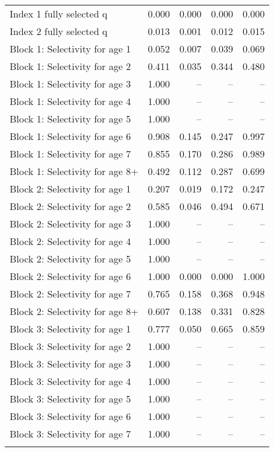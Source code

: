 \documentclass[
]{article}
\begin{document}
\begin{landscape}
\begin{longtable}[t]{lrrrr}
\endfoot
\bottomrule
\endlastfoot
Index 1 fully selected q & 0.000 & 0.000 & 0.000 & 0.000\\
Index 2 fully selected q & 0.013 & 0.001 & 0.012 & 0.015\\
Block 1: Selectivity for age 1 & 0.052 & 0.007 & 0.039 & 0.069\\
Block 1: Selectivity for age 2 & 0.411 & 0.035 & 0.344 & 0.480\\
Block 1: Selectivity for age 3 & 1.000 & -- & -- & --\\
\addlinespace
Block 1: Selectivity for age 4 & 1.000 & -- & -- & --\\
Block 1: Selectivity for age 5 & 1.000 & -- & -- & --\\
Block 1: Selectivity for age 6 & 0.908 & 0.145 & 0.247 & 0.997\\
Block 1: Selectivity for age 7 & 0.855 & 0.170 & 0.286 & 0.989\\
Block 1: Selectivity for age 8+ & 0.492 & 0.112 & 0.287 & 0.699\\
\addlinespace
Block 2: Selectivity for age 1 & 0.207 & 0.019 & 0.172 & 0.247\\
Block 2: Selectivity for age 2 & 0.585 & 0.046 & 0.494 & 0.671\\
Block 2: Selectivity for age 3 & 1.000 & -- & -- & --\\
Block 2: Selectivity for age 4 & 1.000 & -- & -- & --\\
Block 2: Selectivity for age 5 & 1.000 & -- & -- & --\\
\addlinespace
Block 2: Selectivity for age 6 & 1.000 & 0.000 & 0.000 & 1.000\\
Block 2: Selectivity for age 7 & 0.765 & 0.158 & 0.368 & 0.948\\
Block 2: Selectivity for age 8+ & 0.607 & 0.138 & 0.331 & 0.828\\
Block 3: Selectivity for age 1 & 0.777 & 0.050 & 0.665 & 0.859\\
Block 3: Selectivity for age 2 & 1.000 & -- & -- & --\\
\addlinespace
Block 3: Selectivity for age 3 & 1.000 & -- & -- & --\\
Block 3: Selectivity for age 4 & 1.000 & -- & -- & --\\
Block 3: Selectivity for age 5 & 1.000 & -- & -- & --\\
Block 3: Selectivity for age 6 & 1.000 & -- & -- & --\\
Block 3: Selectivity for age 7 & 1.000 & -- & -- & --\\
\addlinespace

\end{longtable}
\end{landscape}
\end{document}
